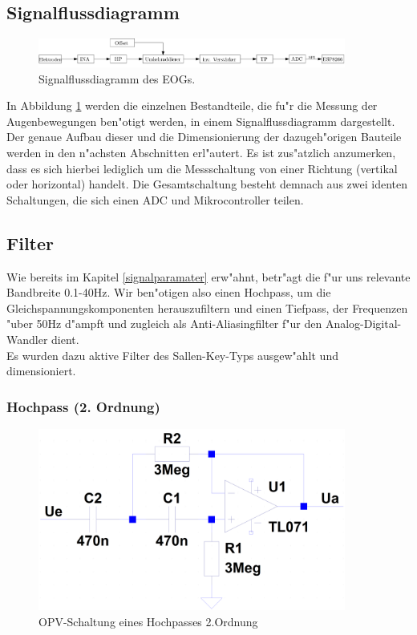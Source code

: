 \subsection {Signalflussdiagramm} \label {signalfluss}
\begin{figure}[H]
	\centering
		\includegraphics[width=0.9\textwidth]{Fuchs/Signalfluss.png}
	\caption{Signalflussdiagramm des EOGs.}
	\label{fig:signalfluss}
\end{figure}

In Abbildung \ref{fig:signalfluss} werden die einzelnen Bestandteile, die fu"r die Messung der Augenbewegungen ben"otigt werden, in einem Signalflussdiagramm dargestellt. Der genaue Aufbau dieser und die Dimensionierung der dazugeh"origen Bauteile werden in den n"achsten Abschnitten erl"autert. Es ist zus"atzlich anzumerken, dass es sich hierbei lediglich um die Messschaltung von einer Richtung (vertikal oder horizontal) handelt. Die Gesamtschaltung besteht demnach aus zwei identen Schaltungen, die sich einen ADC und Mikrocontroller teilen. 

\subsection {Filter} \label {filter}
Wie bereits im Kapitel \ref{signalparamater} erw"ahnt, betr"agt die f"ur uns relevante Bandbreite 0.1-40Hz. Wir ben"otigen also einen Hochpass, um die Gleichspannungskomponenten herauszufiltern und einen Tiefpass, der Frequenzen "uber 50Hz d"ampft und zugleich als Anti-Aliasingfilter f"ur den Analog-Digital-Wandler dient.\\
Es wurden dazu aktive Filter des Sallen-Key-Typs ausgew"ahlt und dimensioniert.

\subsubsection {Hochpass (2. Ordnung)} \label{hp}
\begin{figure}[H]
	\centering
		\includegraphics[width=0.9\textwidth]{Fuchs/Hochpass.png}
	\caption{OPV-Schaltung eines Hochpasses 2.Ordnung}
	\label{fig:hp}
\end{figure}

